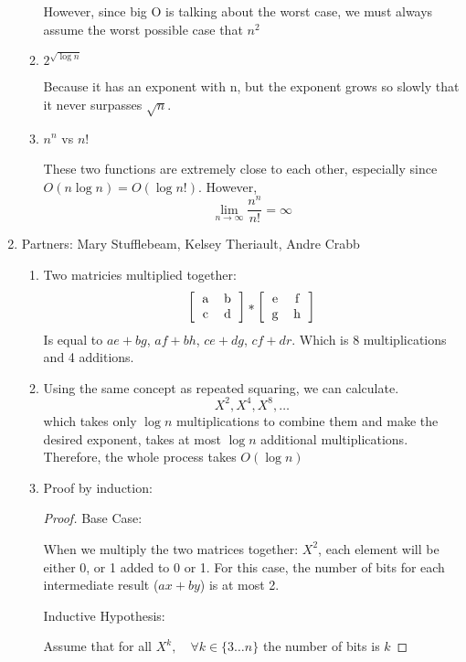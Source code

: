 \documentclass[11pt]{article}
\begin{document}
\begin{enumerate}
\begin{enumerate}
However, since big O is talking about the worst case, we must always assume the
worst possible case that $n^2$ 

\item $2^{\sqrt{\log n}}$

Because it has an exponent with n, but the exponent grows so slowly that it
never surpasses $\sqrt{n}$.

\item $n^n$ vs $n!$

These two functions are extremely close to each other, especially since
$O(n\log n) = O(\log n!)$. However,
\begin{equation*}
\lim_{n \to \infty} \frac{n^n}{n!} = \infty
\end{equation*}
\end{enumerate}
\newpage
\item 
Partners: Mary Stufflebeam, Kelsey Theriault, Andre Crabb
\begin{enumerate}
\item
Two matricies multiplied together:
\begin{equation*}
\left[
\begin{tabular}{c c}
a&b\\
c&d
\end{tabular}
\right]
*
\left[
\begin{tabular}{c c}
e&f\\
g&h
\end{tabular}
\right]
\end{equation*}
Is equal to $ae+bg$, $af+bh$, $ce+dg$, $cf+dr$. Which is 8 multiplications and 4
additions.
\item
Using the same concept as repeated squaring, we can calculate. 
\begin{equation*}
X^2, X^4, X^8, \dots
\end{equation*}
which takes only $\log n$ multiplications to combine them and make the desired
exponent, takes at most $\log n$ additional multiplications. Therefore, the
whole process takes $O(\log n)$
\item
Proof by induction:
\begin{proof}
Base Case: 

When we multiply the two matrices together: $X^2$, each element will be either
0, or 1 added to 0 or 1. For this case, the number of bits for each intermediate
result ($ax + by$) is at most 2.


Inductive Hypothesis:

Assume that for all $X^k, \quad \forall k \in \{3 \dots n\}$ the number of bits
is $k$


\end{proof}
\end{enumerate}
\end{enumerate}
\end{document}

